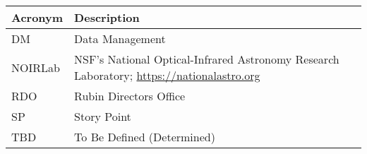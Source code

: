 \addtocounter{table}{-1}
\begin{longtable}{p{}p{}}\hline
\textbf{Acronym} & \textbf{Description}  \\\hline

DM & Data Management \\\hline
NOIRLab & NSF's National Optical-Infrared Astronomy Research Laboratory; \url{https://nationalastro.org} \\\hline
RDO & Rubin Directors Office \\\hline
SP & Story Point \\\hline
TBD & To Be Defined (Determined) \\\hline
\end{longtable}
